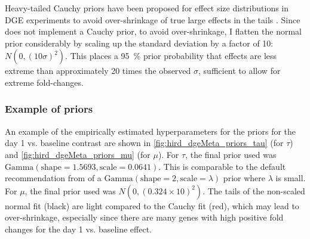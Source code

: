 Heavy-tailed Cauchy priors have been proposed for effect size distributions in \gls{DGE} experiments to avoid over-shrinkage of true large effects in the tails \autocite{zhu2019HeavytailedPriorDistributions}.
Since  does not implement a Cauchy prior, to avoid over-shrinkage, I flatten the normal prior considerably by scaling up the standard deviation by a factor of 10: $N(0, (10\sigma)^2)$.
This places a \SI{95}{\percent} prior probability that effects are less extreme than approximately 20 times the observed $\sigma$, sufficient to allow for extreme fold-changes.

\subsubsection{Example of priors}

An example of the empirically estimated hyperparameters for the priors for the day 1 vs. baseline contrast are shown in \cref{fig:hird_dgeMeta_priors_tau} (for $\tau$) and \cref{fig:hird_dgeMeta_priors_mu} (for $\mu$).
For $\tau$, the final prior used was $\text{Gamma}(\text{shape}=\num{1.5693}, \text{scale}=\num{0.0641})$.
This is comparable to the default recommendation from \textcite{chung2013NondegeneratePenalizedLikelihood} of a $\text{Gamma}(\text{shape}=2, \text{scale}=\lambda)$ prior where $\lambda$ is small.
For $\mu$, the final prior used was $N(0, (0.324 \times 10)^2)$.
The tails of the non-scaled normal fit (black) are light compared to the Cauchy fit (red), which may lead to over-shrinkage, especially since there are many genes with high positive fold changes for the day 1 vs. baseline effect.

